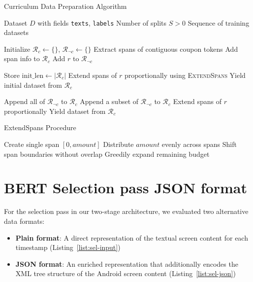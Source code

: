 \documentclass[licencjacka,en]{pracamgr}
\begin{document}
\begin{appendices}
\begin{algorithm}
\caption{Curriculum Data Preparation Algorithm}
\begin{algorithmic}[1]
\Require Dataset $D$ with fields \texttt{texts}, \texttt{labels}
\Require Number of splits $S > 0$
\Ensure Sequence of training datasets

\State Initialize $\mathcal{R}_c \gets \{\}$, $\mathcal{R}_{\neg c} \gets \{\}$
        \State Extract spans of contiguous coupon tokens
        \State Add span info to $\mathcal{R}_c$
    \Else
        \State Add $r$ to $\mathcal{R}_{\neg c}$
    \EndIf
\EndFor

\State Store $\text{init\_len} \gets |\mathcal{R}_c|$
    \State Extend spans of $r$ proportionally using \textsc{ExtendSpans}
\EndFor
\State Yield initial dataset from $\mathcal{R}_c$

        \State Append all of $\mathcal{R}_{\neg c}$ to $\mathcal{R}_c$
        \State Append a subset of $\mathcal{R}_{\neg c}$ to $\mathcal{R}_c$
    \Else
            \State Extend spans of $r$ proportionally
        \EndFor
    \EndIf
    \State Yield dataset from $\mathcal{R}_c$
\EndFor
\end{algorithmic}
\end{algorithm}

\begin{algorithm}
\caption{ExtendSpans Procedure}
\begin{algorithmic}[1]
    \State Create single span $[0, amount]$
\Else
    \State Distribute $amount$ evenly across spans
    \State Shift span boundaries without overlap
    \State Greedily expand remaining budget
\EndIf
\EndProcedure
\end{algorithmic}
\end{algorithm}

\chapter{BERT Selection pass JSON format} \label{AppB}

For the selection pass in our two-stage architecture, we evaluated two alternative data formats:

\begin{itemize}
    \item \textbf{Plain format}: A direct representation of the textual screen content for each timestamp (Listing~\ref{list:sel-input})
    \item \textbf{JSON format}: An enriched representation that additionally encodes the XML tree structure of the Android screen content (Listing~\ref{list:sel-json})
\end{itemize}


\end{appendices}
\end{document}
